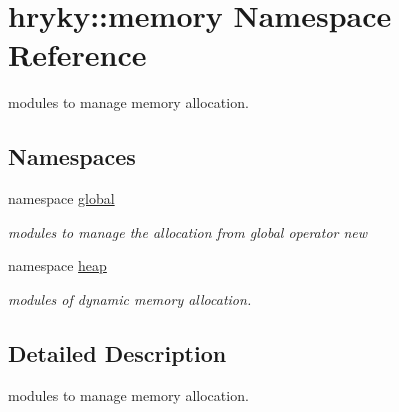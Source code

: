 \hypertarget{namespacehryky_1_1memory}{\section{hryky\-:\-:memory Namespace Reference}
\label{namespacehryky_1_1memory}
}


modules to manage memory allocation.  


\subsection*{Namespaces}
\begin{DoxyCompactItemize}
\item 
namespace \hyperlink{namespacehryky_1_1memory_1_1global}{global}
\begin{DoxyCompactList}\small\item\em modules to manage the allocation from global operator new \end{DoxyCompactList}\item 
namespace \hyperlink{namespacehryky_1_1memory_1_1heap}{heap}
\begin{DoxyCompactList}\small\item\em modules of dynamic memory allocation. \end{DoxyCompactList}\end{DoxyCompactItemize}


\subsection{Detailed Description}
modules to manage memory allocation. 